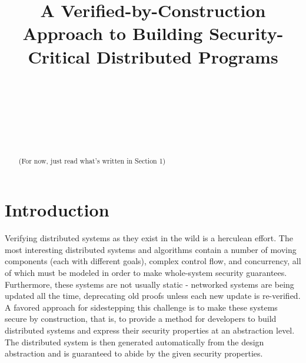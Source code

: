 \documentclass[conference,compsoc]{IEEEtran}
\begin{document}
\title{A Verified-by-Construction Approach to Building Security-Critical
Distributed Programs}

\author{
    \\
    \and
    \\
    \and
    \\\\
}

\maketitle

\begin{abstract}

(For now, just read what's written in Section 1)

\end{abstract}

\IEEEpeerreviewmaketitle

\section{Introduction}

Verifying distributed systems as they exist in the wild is a herculean effort.
The most interesting distributed systems and algorithms contain a number of
moving components (each with different goals), complex control flow, and
concurrency, all of which must be modeled in order to make whole-system security
guarantees. Furthermore, these systems are not usually static - networked
systems are being updated all the time, deprecating old proofs unless each new
update is re-verified. A favored approach for sidestepping this challenge is to
make these systems secure by construction, that is, to provide a method for
developers to build distributed systems and express their security properties at
an abstraction level. The distributed system is then generated automatically
from the design abstraction and is guaranteed to abide by the given security
properties.
\end{document}
